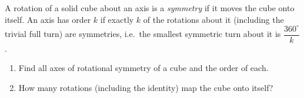 A rotation of a solid cube about an axis is a \emph{symmetry} if it moves the cube onto itself. An axis has order $k$ if exactly $k$ of the rotations about it (including the trivial full turn) are symmetries, i.e.\ the smallest symmetric turn about it is $\dfrac{360^\circ}{k}$.
\begin{enumerate}
\item[(a)] Find all axes of rotational symmetry of a cube and the order of each.
\item[(b)] How many rotations (including the identity) map the cube onto itself?
\end{enumerate}
